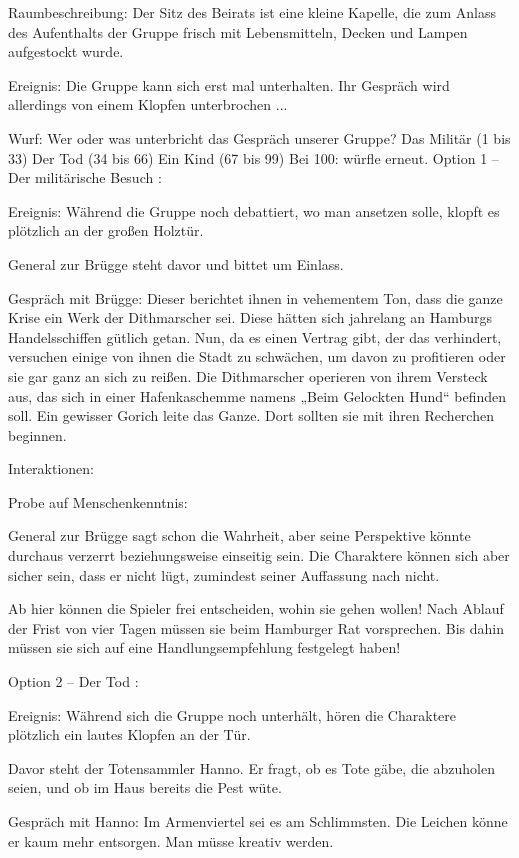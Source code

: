 Raumbeschreibung: Der Sitz des Beirats ist eine kleine Kapelle, die zum Anlass des Aufenthalts der Gruppe frisch mit Lebensmitteln, Decken und Lampen aufgestockt wurde.

Ereignis: Die Gruppe kann sich erst mal unterhalten. Ihr Gespräch wird allerdings von einem Klopfen unterbrochen ...

Wurf: Wer oder was unterbricht das Gespräch unserer Gruppe?
Das Militär (1 bis 33)
Der Tod (34 bis 66)
Ein Kind (67 bis 99)
Bei 100: würfle erneut.
Option 1 – Der militärische Besuch
:

Ereignis: Während die Gruppe noch debattiert, wo man ansetzen solle, klopft es plötzlich an der großen Holztür.

General zur Brügge steht davor und bittet um Einlass.

Gespräch mit Brügge: Dieser berichtet ihnen in vehementem Ton, dass die ganze Krise ein Werk der Dithmarscher sei. Diese hätten sich jahrelang an Hamburgs Handelsschiffen gütlich getan. Nun, da es einen Vertrag gibt, der das verhindert, versuchen einige von ihnen die Stadt zu schwächen, um davon zu profitieren oder sie gar ganz an sich zu reißen. Die Dithmarscher operieren von ihrem Versteck aus, das sich in einer Hafenkaschemme namens „Beim Gelockten Hund“ befinden soll. Ein gewisser Gorich leite das Ganze. Dort sollten sie mit ihren Recherchen beginnen.

Interaktionen:

Probe auf Menschenkenntnis:

General zur Brügge sagt schon die Wahrheit, aber seine Perspektive könnte durchaus verzerrt beziehungsweise einseitig sein.
Die Charaktere können sich aber sicher sein, dass er nicht lügt, zumindest seiner Auffassung nach nicht.

Ab hier können die Spieler frei entscheiden, wohin sie gehen wollen! Nach Ablauf der Frist von vier Tagen müssen sie beim Hamburger Rat vorsprechen. Bis dahin müssen sie sich auf eine Handlungsempfehlung festgelegt haben!


Option 2 – Der Tod
:

Ereignis: Während sich die Gruppe noch unterhält, hören die Charaktere plötzlich ein lautes Klopfen an der Tür.

Davor steht der Totensammler Hanno. Er fragt, ob es Tote gäbe, die abzuholen seien, und ob im Haus bereits die Pest wüte.

Gespräch mit Hanno: Im Armenviertel sei es am Schlimmsten. Die Leichen könne er kaum mehr entsorgen. Man müsse kreativ werden.


